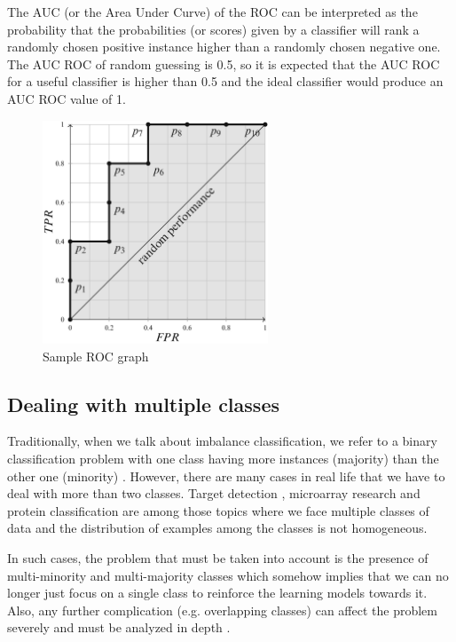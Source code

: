 The AUC (or the Area Under Curve) of the ROC can be interpreted as the probability that the 
probabilities (or scores) given by a classifier will rank a randomly chosen positive instance 
higher than a randomly chosen negative one. The AUC ROC of random guessing is 0.5, so it is 
expected that the AUC ROC for a useful classifier is higher than 0.5 and the ideal classifier 
would produce an AUC ROC value of 1.

\begin{figure}[ht]
    \centering
    \includegraphics[width=0.60\textwidth]{figures/12RocExample.png}
    \caption{Sample ROC graph}
    \label{fig:roc}
\end{figure}


\subsection{Dealing with multiple classes}

Traditionally, when we talk about imbalance classification, we refer to a binary classification 
problem with one class having more instances (majority) than the other one (minority)
\cite{haibo_he_learning_2009, branco2015survey}. However, there are many cases in real life 
that we have to deal with more than two classes. Target detection \cite{razakarivony2016vehicle},  
microarray research \cite{yu2013recognition} and protein classification \cite{zhao2008protein} 
are among those topics where we face multiple classes of data and the distribution of examples among 
the classes is not homogeneous.
 
In such cases, the problem that must be taken into account is the presence of multi-minority 
and multi-majority classes \cite{wang2016dealing} which somehow implies that we can no 
longer just focus on a single class to reinforce the learning models towards it. Also, 
any further complication (e.g. overlapping classes) can affect the problem severely and must be 
analyzed in depth \cite{saez2016analyzing}.


